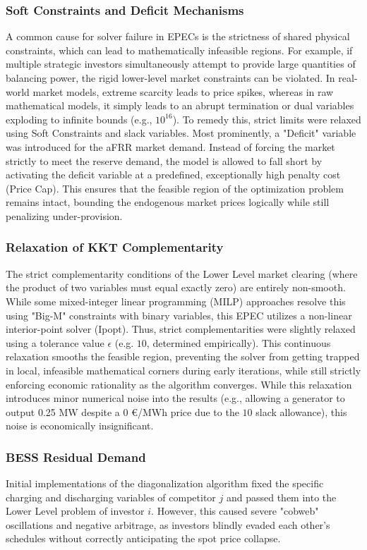  \subsubsection{Soft Constraints and Deficit Mechanisms} \label{subsect:Soft_Constraints}
 A common cause for solver failure in EPECs is the strictness of shared physical constraints, which can lead to mathematically infeasible regions. For example, if multiple strategic investors simultaneously attempt to provide large quantities of balancing power, the rigid lower-level market constraints can be violated. In real-world market models, extreme scarcity leads to price spikes, whereas in raw mathematical models, it simply leads to an abrupt termination or dual variables exploding to infinite bounds (e.g., \(10^{16}\)). To remedy this, strict limits were relaxed using Soft Constraints and slack variables. Most prominently, a "Deficit" variable was introduced for the aFRR market demand. Instead of forcing the market strictly to meet the reserve demand, the model is allowed to fall short by activating the deficit variable at a predefined, exceptionally high penalty cost (Price Cap). This ensures that the feasible region of the optimization problem remains intact, bounding the endogenous market prices logically while still penalizing under-provision.

 \subsubsection{Relaxation of KKT Complementarity} \label{subsect:KKT_Relaxation}
 The strict complementarity conditions of the Lower Level market clearing (where the product of two variables must equal exactly zero) are entirely non-smooth. While some mixed-integer linear programming (MILP) approaches resolve this using "Big-M" constraints with binary variables, this EPEC utilizes a non-linear interior-point solver (Ipopt). Thus, strict complementarities were slightly relaxed using a tolerance value \(\epsilon\) (e.g. \(10\), determined empirically). This continuous relaxation smooths the feasible region, preventing the solver from getting trapped in local, infeasible mathematical corners during early iterations, while still strictly enforcing economic rationality as the algorithm converges. While this relaxation introduces minor numerical noise into the results (e.g., allowing a generator to output 0.25 MW despite a 0 €/MWh price due to the $10$ slack allowance), this noise is economically insignificant. 

\subsubsection{BESS Residual Demand}
Initial implementations of the diagonalization algorithm fixed the specific charging and discharging variables of competitor $j$ and passed them into the Lower Level problem of investor $i$. However, this caused severe "cobweb" oscillations and negative arbitrage, as investors blindly evaded each other's schedules without correctly anticipating the spot price collapse. 

